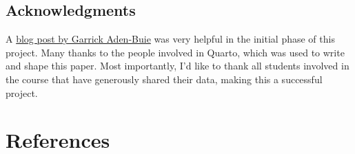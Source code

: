 \documentclass[
]{agujournal2019}
\begin{document}
\hypertarget{acknowledgments}{%
\subsection*{Acknowledgments}\label{acknowledgments}}

A
\href{https://www.garrickadenbuie.com/blog/use-google-forms-and-r-to-track-data-easily/}{blog
post by Garrick Aden-Buie} was very helpful in the initial phase of this
project. Many thanks to the people involved in Quarto, which was used to
write and shape this paper. Most importantly, I'd like to thank all
students involved in the course that have generously shared their data,
making this a successful project.

\hypertarget{references}{%
\section*{References}\label{references}}
\end{document}
